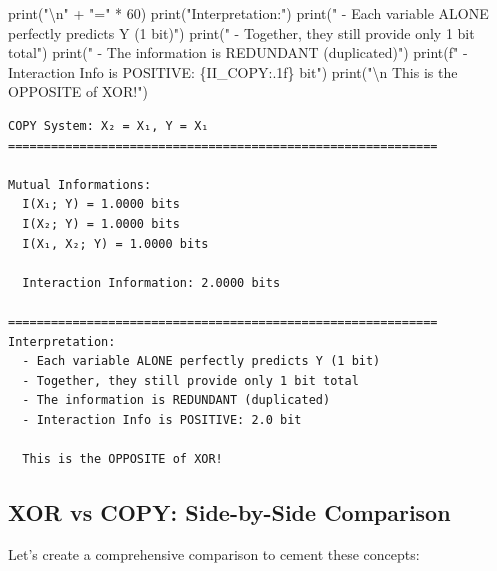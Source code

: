 \documentclass[
  11pt,
  letterpaper,
  oneside,
  openany]{book}
\newenvironment{Shaded}{\begin{snugshade}}{\end{snugshade}}
\newcommand{\BuiltInTok}[1]{\textcolor[rgb]{0.00,0.23,0.31}{#1}}
\newcommand{\CharTok}[1]{\textcolor[rgb]{0.13,0.47,0.30}{#1}}
\newcommand{\DecValTok}[1]{\textcolor[rgb]{0.68,0.00,0.00}{#1}}
\newcommand{\NormalTok}[1]{\textcolor[rgb]{0.00,0.23,0.31}{#1}}
\newcommand{\OperatorTok}[1]{\textcolor[rgb]{0.37,0.37,0.37}{#1}}
\newcommand{\SpecialCharTok}[1]{\textcolor[rgb]{0.37,0.37,0.37}{#1}}
\newcommand{\SpecialStringTok}[1]{\textcolor[rgb]{0.13,0.47,0.30}{#1}}
\newcommand{\StringTok}[1]{\textcolor[rgb]{0.13,0.47,0.30}{#1}}
\begin{document}
\begin{Shaded}
\begin{Highlighting}[]
\BuiltInTok{print}\NormalTok{(}\StringTok{"}\CharTok{\textbackslash{}n}\StringTok{"} \OperatorTok{+} \StringTok{"="} \OperatorTok{*} \DecValTok{60}\NormalTok{)}
\BuiltInTok{print}\NormalTok{(}\StringTok{"Interpretation:"}\NormalTok{)}
\BuiltInTok{print}\NormalTok{(}\StringTok{"  {-} Each variable ALONE perfectly predicts Y (1 bit)"}\NormalTok{)}
\BuiltInTok{print}\NormalTok{(}\StringTok{"  {-} Together, they still provide only 1 bit total"}\NormalTok{)}
\BuiltInTok{print}\NormalTok{(}\StringTok{"  {-} The information is REDUNDANT (duplicated)"}\NormalTok{)}
\BuiltInTok{print}\NormalTok{(}\SpecialStringTok{f"  {-} Interaction Info is POSITIVE: }\SpecialCharTok{\{}\NormalTok{II\_COPY}\SpecialCharTok{:.1f\}}\SpecialStringTok{ bit"}\NormalTok{)}
\BuiltInTok{print}\NormalTok{(}\StringTok{"}\CharTok{\textbackslash{}n}\StringTok{  This is the OPPOSITE of XOR!"}\NormalTok{)}
\end{Highlighting}
\end{Shaded}

\begin{verbatim}
COPY System: X₂ = X₁, Y = X₁
============================================================

Mutual Informations:
  I(X₁; Y) = 1.0000 bits
  I(X₂; Y) = 1.0000 bits
  I(X₁, X₂; Y) = 1.0000 bits

  Interaction Information: 2.0000 bits

============================================================
Interpretation:
  - Each variable ALONE perfectly predicts Y (1 bit)
  - Together, they still provide only 1 bit total
  - The information is REDUNDANT (duplicated)
  - Interaction Info is POSITIVE: 2.0 bit

  This is the OPPOSITE of XOR!
\end{verbatim}

\subsection{XOR vs COPY: Side-by-Side
Comparison}\label{xor-vs-copy-side-by-side-comparison}

Let's create a comprehensive comparison to cement these concepts:
\end{document}

